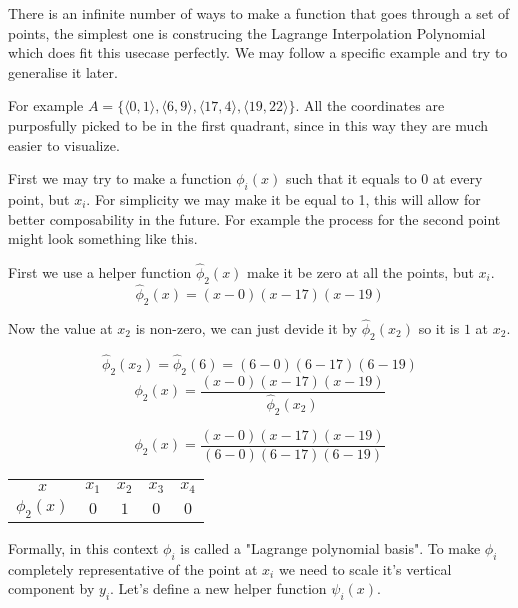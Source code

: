 \documentclass[12pt, titlepage]{article}
\begin{document}
There is an infinite number of ways to make a function that goes through a set of
points, the simplest one is construcing the Lagrange Interpolation Polynomial
which does fit this usecase perfectly. We may follow a specific example 
and try to generalise it later. 

For example $A = \{\langle 0, 1 \rangle, \langle 6, 9 \rangle, 
\langle 17, 4 \rangle, \langle 19, 22 \rangle\}$. All the coordinates are
purposfully picked to be in the first quadrant, since in this way they are
much easier to visualize.

First we may try to make a function $\phi_i(x)$ such that it equals to 0 at
every point, but $x_i$. For simplicity we may make it be equal to 1, this will
allow for better composability in the future. For example the process for 
the second point might look something like this.

First we use a helper function $\hat{\phi}_2(x)$ make it be zero at all the points, but $x_i$.
\begin{equation}
    \hat{\phi}_2(x) = (x - 0)(x - 17)(x - 19)
\end{equation}

Now the value at $x_2$ is non-zero, we can just devide it by $\hat{\phi}_2(x_2)$ 
so it is $1$ at $x_2$.

\begin{equation}
    \hat{\phi}_2(x_2) = \hat{\phi}_2(6) = (6 - 0)(6 - 17)(6 - 19)
\end{equation}
\begin{equation}
    \phi_2(x) = \frac{(x - 0)(x - 17)(x - 19)}{\hat{\phi}_2(x_2)}
\end{equation}

\begin{equation}
    \phi_2(x) = \frac{(x - 0)(x - 17)(x - 19)}{(6 - 0)(6 - 17)(6 - 19)}
\end{equation}

{
\centering
\begin{tabular}{c|c c c c}
    $x$ & $x_1$ & $x_2$ & $x_3$ & $x_4$ \\
    $\phi_2(x)$ & $0$ & $1$ & $0$ & $0$ \\
\end{tabular}\par
}

Formally, in this context $\phi_i$ is called a "Lagrange polynomial basis".
To make $\phi_i$ completely representative of the point at $x_i$ we need to 
scale it's vertical component by $y_i$. Let's define a new helper 
function $\psi_i(x)$.
\end{document}
